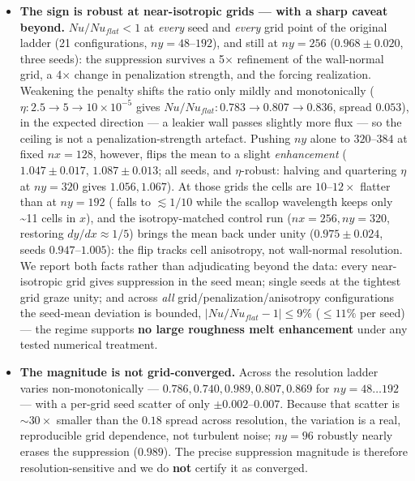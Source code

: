 \documentclass[11pt]{article}
\begin{document}
\begin{itemize}
\item \textbf{The sign is robust at near-isotropic grids — with a sharp caveat beyond.} $Nu/Nu_{flat}<1$ at \emph{every} seed and \emph{every} grid point of the original ladder (21 configurations, $ny=48–192$), and still at $ny=256$ ($0.968\pm 0.020$, three seeds): the suppression survives a 5\ensuremath{\times} refinement of the wall-normal grid, a 4\ensuremath{\times} change in penalization strength, and the forcing realization. Weakening the penalty shifts the ratio only mildly and monotonically ($\eta : 2.5\to 5\to 10\times 10^{-5}$ gives $Nu/Nu_{flat}: 0.783\to 0.807\to 0.836$, spread $0.053$), in the expected direction — a leakier wall passes slightly more flux — so the ceiling is not a penalization-strength artefact. Pushing $ny$ alone to $320–384$ at fixed $nx=128$, however, flips the mean to a slight \emph{enhancement} ($1.047\pm 0.017$, $1.087\pm 0.013$; all seeds, and \ensuremath{\eta}-robust: halving and quartering $\eta $ at $ny=320$ gives $1.056, 1.067$). At those grids the cells are $10–12\times $ flatter than at $ny=192$ ( falls to $\lesssim 1/10$ while the scallop wavelength keeps only \textasciitilde{}11 cells in $x$), and the isotropy-matched control run ($nx=256, ny=320$, restoring $dy/dx\approx 1/5$) brings the mean back under unity ($0.975\pm 0.024$, seeds $0.947–1.005$): the flip tracks cell anisotropy, not wall-normal resolution. We report both facts rather than adjudicating beyond the data: every near-isotropic grid gives suppression in the seed mean; single seeds at the tightest grid graze unity; and across \emph{all} grid/penalization/anisotropy configurations the seed-mean deviation is bounded, $|Nu/Nu_{flat}-1| \le  9\%$ ($\le  11\%$ per seed) — the regime supports \textbf{no large roughness melt enhancement} under any tested numerical treatment.
\item \textbf{The magnitude is not grid-converged.} Across the resolution ladder  varies non-monotonically — $0.786, 0.740, 0.989, 0.807, 0.869$ for $ny=48\ldots 192$ — with a per-grid seed scatter of only $\pm 0.002–0.007$. Because that scatter is $\sim 30\times $ smaller than the $0.18$ spread across resolution, the variation is a real, reproducible grid dependence, not turbulent noise; $ny=96$ robustly nearly erases the suppression ($0.989$). The precise suppression magnitude is therefore resolution-sensitive and we do \textbf{not} certify it as converged.
\end{itemize}
\end{document}
